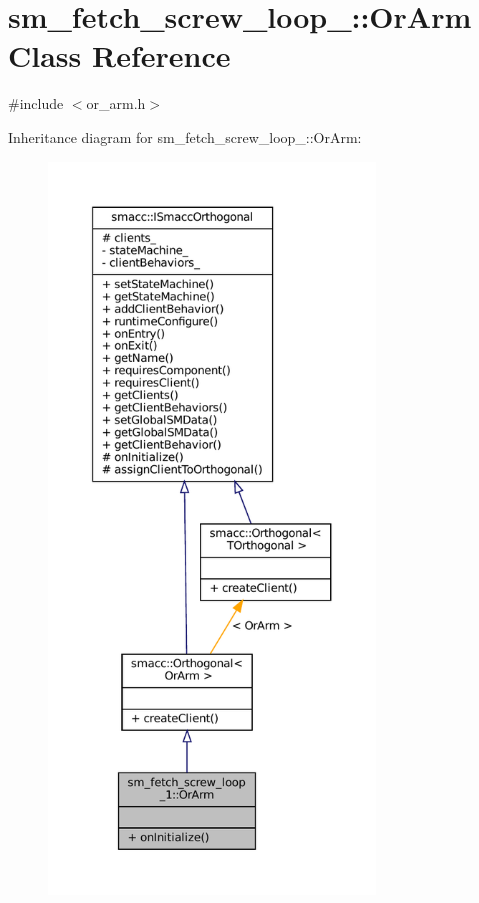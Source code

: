 \hypertarget{classsm__fetch__screw__loop__1_1_1OrArm}{}\section{sm\+\_\+fetch\+\_\+screw\+\_\+loop\+\_\+:\+:Or\+Arm Class Reference}
\label{classsm__fetch__screw__loop__1_1_1OrArm}


{\ttfamily \#include $<$or\+\_\+arm.\+h$>$}



Inheritance diagram for sm\+\_\+fetch\+\_\+screw\+\_\+loop\+\_\+:\+:Or\+Arm\+:
\nopagebreak
\begin{figure}[H]
\begin{center}
\leavevmode
\includegraphics[height=550pt]{classsm__fetch__screw__loop__1_1_1OrArm__inherit__graph}
\end{center}
\end{figure}


